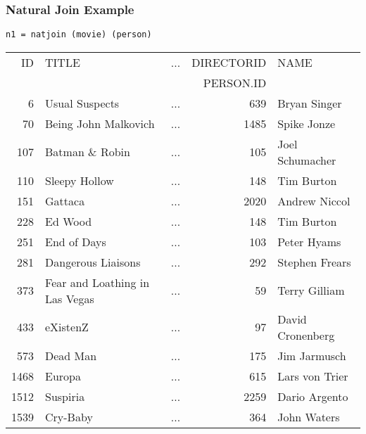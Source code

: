 \documentclass[dvipsnames]{beamer}
\theoremstyle{plain}
\begin{document}
\begin{frame}[fragile]
  \frametitle{Natural Join Example}

  \begin{example}
    \begin{lstlisting}
n1 = natjoin (movie) (person)
    \end{lstlisting}

    \pause
    \begin{tiny}
    \begin{table}
      \begin{tabular}{|r|l|c|r|l|}\hline
  ID & TITLE                          & ... & DIRECTORID & NAME            \\
     &                                &     &  PERSON.ID &                 \\\hline\hline
   6 & Usual Suspects                 & ... &        639 & Bryan Singer    \\\hline
  70 & Being John Malkovich           & ... &       1485 & Spike Jonze     \\\hline
 107 & Batman \& Robin                & ... &        105 & Joel Schumacher \\\hline
 110 & Sleepy Hollow                  & ... &        148 & Tim Burton      \\\hline
 151 & Gattaca                        & ... &       2020 & Andrew Niccol   \\\hline
 228 & Ed Wood                        & ... &        148 & Tim Burton      \\\hline
 251 & End of Days                    & ... &        103 & Peter Hyams     \\\hline
 281 & Dangerous Liaisons             & ... &        292 & Stephen Frears  \\\hline
 373 & Fear and Loathing in Las Vegas & ... &         59 & Terry Gilliam   \\\hline
 433 & eXistenZ                       & ... &         97 & David Cronenberg\\\hline
 573 & Dead Man                       & ... &        175 & Jim Jarmusch    \\\hline
1468 & Europa                         & ... &        615 & Lars von Trier  \\\hline
1512 & Suspiria                       & ... &       2259 & Dario Argento   \\\hline
1539 & Cry-Baby                       & ... &        364 & John Waters     \\\hline
      \end{tabular}
    \end{table}
    \end{tiny}
  \end{example}
\end{frame}
\end{document}
